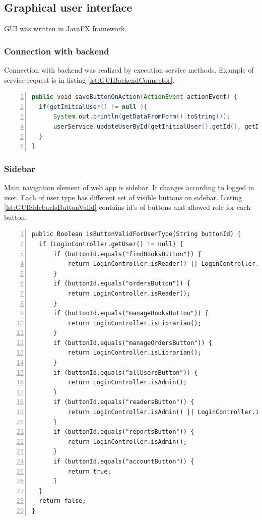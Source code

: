 \subsection{Graphical user interface}
GUI was written in JavaFX framework.

\subsubsection{Connection with backend}
Connection with backend was realized by execution service methods. Example of service request is in listing \ref{lst:GUIBackendConnector}.

\begin{lstlisting}[breaklines=true, numbers=left, stepnumber=1, label={lst:GUIBackendConnector}, caption={Connection with backend through \textit{userService}}, language=Java]
public void saveButtonOnAction(ActionEvent actionEvent) {
  if(getInitialUser() != null ){
      System.out.println(getDataFromForm().toString());
      userService.updateUserById(getInitialUser().getId(), getDataFromForm());
  }
}
\end{lstlisting}

\subsubsection{Sidebar}
Main navigation element of web app is sidebar. It changes according to logged in user. Each of user type has different set of visible buttons on sidebar. Listing \ref{lst:GUISidebarIsButtonValid} contains id's of buttons and allowed role for each button. 


\begin{lstlisting}[breaklines=true, numbers=left, stepnumber=1, label={lst:GUISidebarIsButtonValid}, caption={Sidebar buttons with allowed user types}]
public Boolean isButtonValidForUserType(String buttonId) {
  if (LoginController.getUser() != null) {
      if (buttonId.equals("findBooksButton")) {
          return LoginController.isReader() || LoginController.isLibrarian();
      }
      if (buttonId.equals("ordersButton")) {
          return LoginController.isReader();
      }
      if (buttonId.equals("manageBooksButton")) {
          return LoginController.isLibrarian();
      }
      if (buttonId.equals("manageOrdersButton")) {
          return LoginController.isLibrarian();
      }
      if (buttonId.equals("allUsersButton")) {
          return LoginController.isAdmin();
      }
      if (buttonId.equals("readersButton")) {
          return LoginController.isAdmin() || LoginController.isLibrarian();
      }
      if (buttonId.equals("reportsButton")) {
          return LoginController.isAdmin();
      }
      if (buttonId.equals("accountButton")) {
          return true;
      }
  }
  return false;
}
\end{lstlisting}

